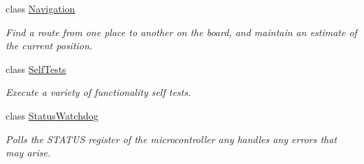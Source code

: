 \begin{DoxyCompactItemize}
class \hyperlink{classIDP_1_1Navigation}{Navigation}
\begin{DoxyCompactList}\small\item\em Find a route from one place to another on the board, and maintain an estimate of the current position. \item\end{DoxyCompactList}\item 
class \hyperlink{classIDP_1_1SelfTests}{SelfTests}
\begin{DoxyCompactList}\small\item\em Execute a variety of functionality self tests. \item\end{DoxyCompactList}\item 
class \hyperlink{classIDP_1_1StatusWatchdog}{StatusWatchdog}
\begin{DoxyCompactList}\small\item\em Polls the STATUS register of the microcontroller any handles any errors that may arise. \item\end{DoxyCompactList}\end{DoxyCompactItemize}
